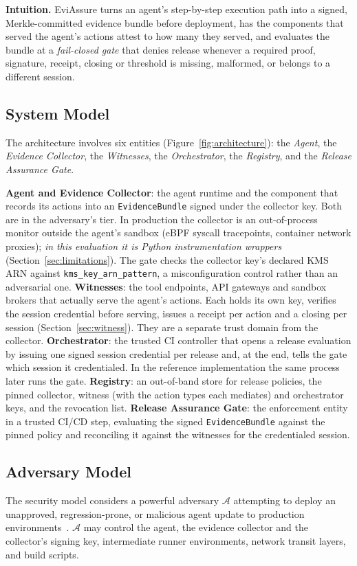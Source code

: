 \documentclass[letterpaper,10pt,twocolumn]{article}
\theoremstyle{definition}
\begin{document}
\textbf{Intuition.} EviAssure turns an agent's step-by-step execution path into a signed, Merkle-committed evidence bundle before deployment, has the components that served the agent's actions attest to how many they served, and evaluates the bundle at a \emph{fail-closed gate} that denies release whenever a required proof, signature, receipt, closing or threshold is missing, malformed, or belongs to a different session.

\subsection{System Model}
The architecture involves six entities (Figure~\ref{fig:architecture}): the \emph{Agent}, the \emph{Evidence Collector}, the \emph{Witnesses}, the \emph{Orchestrator}, the \emph{Registry}, and the \emph{Release Assurance Gate}.

\textbf{Agent and Evidence Collector}: the agent runtime and the component that records its actions into an \texttt{EvidenceBundle} signed under the collector key. Both are in the adversary's tier. In production the collector is an out-of-process monitor outside the agent's sandbox (eBPF syscall tracepoints, container network proxies); \emph{in this evaluation it is Python instrumentation wrappers} (Section~\ref{sec:limitations}). The gate checks the collector key's declared KMS ARN against \nolinkurl{kms_key_arn_pattern}, a misconfiguration control rather than an adversarial one.
\textbf{Witnesses}: the tool endpoints, API gateways and sandbox brokers that actually serve the agent's actions. Each holds its own key, verifies the session credential before serving, issues a receipt per action and a closing per session (Section~\ref{sec:witness}). They are a separate trust domain from the collector.
\textbf{Orchestrator}: the trusted CI controller that opens a release evaluation by issuing one signed session credential per release and, at the end, tells the gate which session it credentialed. In the reference implementation the same process later runs the gate.
\textbf{Registry}: an out-of-band store for release policies, the pinned collector, witness (with the action types each mediates) and orchestrator keys, and the revocation list.
\textbf{Release Assurance Gate}: the enforcement entity in a trusted CI/CD step, evaluating the signed \texttt{EvidenceBundle} against the pinned policy and reconciling it against the witnesses for the credentialed session.


\subsection{Adversary Model}\label{sec:threat}
The security model considers a powerful adversary $\mathcal{A}$ attempting to deploy an unapproved, regression-prone, or malicious agent update to production environments~\cite{shostack2014threat, carlini2024poisoning, schuster2021get}. $\mathcal{A}$ may control the agent, the evidence collector and the collector's signing key, intermediate runner environments, network transit layers, and build scripts.
\end{document}
